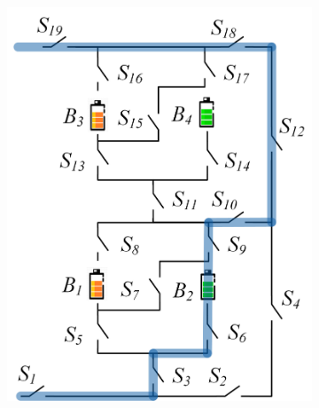 \documentclass{article}
\providecommand{\DIFaddbeginFL}{} %
\providecommand{\DIFaddendFL}{} %
\providecommand{\DIFdelbeginFL}{} %
\providecommand{\DIFdelendFL}{} %
\newcommand{\DIFscaledelfig}{0.5}
\newlength{\DIFdelgraphicswidth} %
\newlength{\DIFdelgraphicsheight} %
\newcommand{\DIFaddincludegraphics}[2][]{{\color{blue}\fbox{\DIFOincludegraphics[#1]{#2}}}} %
\newcommand{\DIFdelincludegraphics}[2][]{%
\sbox{\DIFdelgraphicsbox}{\DIFOincludegraphics[#1]{#2}}%
\settoboxwidth{\DIFdelgraphicswidth}{\DIFdelgraphicsbox} %
\settoboxtotalheight{\DIFdelgraphicsheight}{\DIFdelgraphicsbox} %
\scalebox{\DIFscaledelfig}{%
\parbox[b]{\DIFdelgraphicswidth}{\usebox{\DIFdelgraphicsbox}\\[-\baselineskip] \rule{\DIFdelgraphicswidth}{0em}}\llap{\resizebox{\DIFdelgraphicswidth}{\DIFdelgraphicsheight}{%
\setlength{\unitlength}{\DIFdelgraphicswidth}%
\begin{picture}(1,1)%
\thicklines\linethickness{2pt} %
{\color[rgb]{1,0,0}\put(0,0){\framebox(1,1){}}}%
{\color[rgb]{1,0,0}\put(0,0){\line( 1,1){1}}}%
{\color[rgb]{1,0,0}\put(0,1){\line(1,-1){1}}}%
\end{picture}%
}\hspace*{3pt}}} %
} %
\DeclareRobustCommand{\DIFaddbeginFL}{\DIFOaddbeginFL \let\includegraphics\DIFaddincludegraphics} %
\DeclareRobustCommand{\DIFaddendFL}{\DIFOaddendFL \let\includegraphics\DIFOincludegraphics} %
\DeclareRobustCommand{\DIFdelbeginFL}{\DIFOdelbeginFL \let\includegraphics\DIFdelincludegraphics} %
\DeclareRobustCommand{\DIFdelendFL}{\DIFOaddendFL \let\includegraphics\DIFOincludegraphics} %
\begin{document}
\begin{figure}[htbp]
\begin{subfigure}[b]{0.31\textwidth}
\DIFdelendFL \DIFaddbeginFL \includegraphics[width=\textwidth]{e2f2-isolate-2w.png}
        \DIFaddendFL \caption{}
        \label{fig:my-isolated-2w}
    \end{subfigure}
    \hspace{0.02\textwidth}
    \begin{subfigure}[b]{0.31\textwidth}
        \DIFdelbeginFL %

\end{subfigure}
\end{figure}
\end{document}
